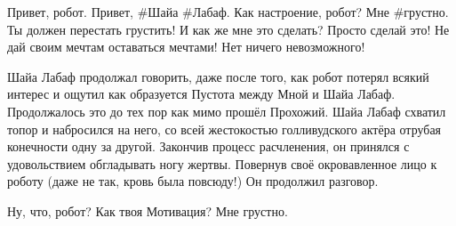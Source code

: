 \begin{dialog}
\X Привет, робот.
\R Привет, \#Шайа \#Лабаф.
\X Как настроение, робот?
\R Мне \#грустно.
\X Ты должен перестать грустить!
\R И как же мне это сделать?
\X Просто сделай это! Не дай своим мечтам оставаться мечтами! Нет ничего невозможного!
\end{dialog}

\begin{monolog}
Шайа Лабаф продолжал говорить, даже после того, как робот потерял всякий интерес и ощутил как образуется Пустота между Мной и Шайа Лабаф. Продолжалось это до тех пор как мимо прошёл Прохожий. Шайа Лабаф схватил топор и набросился на него, со всей жестокостью голливудского актёра отрубая конечности одну за другой. Закончив процесс расчленения, он принялся с удовольствием обгладывать ногу жертвы. Повернув своё окровавленное лицо к роботу (даже не так, кровь была повсюду!) Он продолжил разговор.
\end{monolog}

\begin{dialog}
\X Ну, что, робот? Как твоя Мотивация?
\R Мне грустно.
\end{dialog}